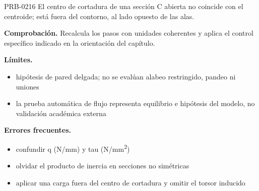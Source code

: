 \begin{studiumworked}{PRB-0216}
El centro de cortadura de una sección C abierta no coincide con el centroide; está fuera del contorno, al lado opuesto de las alas.

\par\textbf{Comprobación.} Recalcula los pasos con unidades coherentes y aplica el control específico indicado en la orientación del capítulo.

\textbf{Límites.}\begin{itemize}\item hipótesis de pared delgada; no se evalúan alabeo restringido, pandeo ni uniones
\item la prueba automática de flujo representa equilibrio e hipótesis del modelo, no validación académica externa\end{itemize}

\textbf{Errores frecuentes.}\begin{itemize}\item confundir q (N/mm) y tau (N/mm\textsuperscript{2})
\item olvidar el producto de inercia en secciones no simétricas
\item aplicar una carga fuera del centro de cortadura y omitir el torsor inducido\end{itemize}

\end{studiumworked}

\Needspace{.3\textheight}

